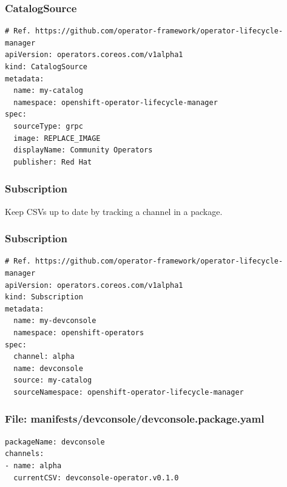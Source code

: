 \documentclass[aspectratio=169]{beamer}
\begin{document}
\begin{frame}[fragile]
  \frametitle{CatalogSource}

  \begin{Verbatim}[fontsize=\small]
# Ref. https://github.com/operator-framework/operator-lifecycle-manager
apiVersion: operators.coreos.com/v1alpha1
kind: CatalogSource
metadata:
  name: my-catalog
  namespace: openshift-operator-lifecycle-manager
spec:
  sourceType: grpc
  image: REPLACE_IMAGE
  displayName: Community Operators
  publisher: Red Hat
  \end{Verbatim}
\end{frame}

\begin{frame}

  \frametitle{Subscription}

  Keep CSVs up to date by tracking a channel in a package.

\end{frame}

\begin{frame}[fragile]
  \frametitle{Subscription}

  \begin{Verbatim}[fontsize=\small]
# Ref. https://github.com/operator-framework/operator-lifecycle-manager
apiVersion: operators.coreos.com/v1alpha1
kind: Subscription
metadata:
  name: my-devconsole
  namespace: openshift-operators
spec:
  channel: alpha
  name: devconsole
  source: my-catalog
  sourceNamespace: openshift-operator-lifecycle-manager
  \end{Verbatim}
\end{frame}

\begin{frame}[fragile]

  \frametitle{File: manifests/devconsole/devconsole.package.yaml}

  \begin{Verbatim}[fontsize=\small]
packageName: devconsole
channels:
- name: alpha
  currentCSV: devconsole-operator.v0.1.0
  \end{Verbatim}
\end{frame}
\end{document}
